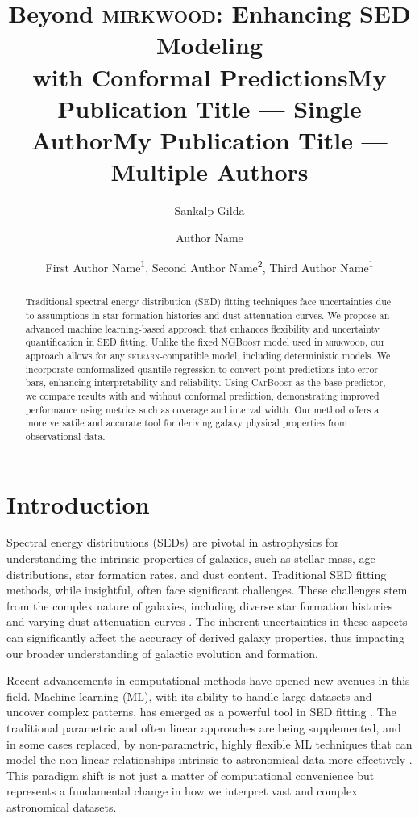 \documentclass[letterpaper]{article}
\title{Beyond \textsc{mirkwood}: Enhancing SED Modeling\\with Conformal Predictions}
\author{
Sankalp Gilda
}
\title{My Publication Title --- Single Author}
\author {
Author Name
}
\title{My Publication Title --- Multiple Authors}
\author {
First Author Name\textsuperscript{\rm 1},
Second Author Name\textsuperscript{\rm 2},
Third Author Name\textsuperscript{\rm 1}
}
\begin{document}
\maketitle

\begin{abstract}
Traditional spectral energy distribution (SED) fitting techniques face uncertainties due to assumptions in star formation histories and dust attenuation curves. We propose an advanced machine learning-based approach that enhances flexibility and uncertainty quantification in SED fitting. Unlike the fixed \textsc{NGBoost} model used in \textsc{mirkwood}, our approach allows for any \textsc{sklearn}-compatible model, including deterministic models. We incorporate conformalized quantile regression to convert point predictions into error bars, enhancing interpretability and reliability. Using \textsc{CatBoost} as the base predictor, we compare results with and without conformal prediction, demonstrating improved performance using metrics such as coverage and interval width. Our method offers a more versatile and accurate tool for deriving galaxy physical properties from observational data.
\end{abstract}




\section{Introduction}
Spectral energy distributions (SEDs) are pivotal in astrophysics for understanding the intrinsic properties of galaxies, such as stellar mass, age distributions, star formation rates, and dust content. Traditional SED fitting methods, while insightful, often face significant challenges. These challenges stem from the complex nature of galaxies, including diverse star formation histories and varying dust attenuation curves \cite{Gilda21, acquaviva2015simultaneous, simha2014parametrising}. The inherent uncertainties in these aspects can significantly affect the accuracy of derived galaxy properties, thus impacting our broader understanding of galactic evolution and formation.

Recent advancements in computational methods have opened new avenues in this field. Machine learning (ML), with its ability to handle large datasets and uncover complex patterns, has emerged as a powerful tool in SED fitting \cite{Gilda21, gilda_antoine, Chu2023galaxy}. The traditional parametric and often linear approaches are being supplemented, and in some cases replaced, by non-parametric, highly flexible ML techniques that can model the non-linear relationships intrinsic to astronomical data more effectively \cite{deepremap, deepremap_abstract_aas, cfht, neurips_cfht, feature_selection}. This paradigm shift is not just a matter of computational convenience but represents a fundamental change in how we interpret vast and complex astronomical datasets.
\end{document}
